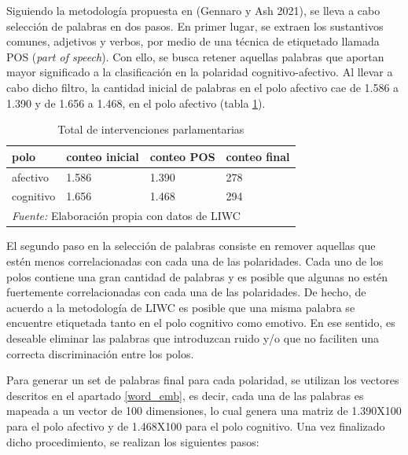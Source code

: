 \documentclass[
  12pt,
]{article}
\begin{document}
Siguiendo la metodología propuesta en (Gennaro y Ash 2021), se lleva a
cabo selección de palabras en dos pasos. En primer lugar, se extraen los
sustantivos comunes, adjetivos y verbos, por medio de una técnica de
etiquetado llamada POS (\emph{part of speech}). Con ello, se busca
retener aquellas palabras que aportan mayor significado a la
clasificación en la polaridad cognitivo-afectivo. Al llevar a cabo dicho
filtro, la cantidad inicial de palabras en el polo afectivo cae de 1.586
a 1.390 y de 1.656 a 1.468, en el polo afectivo (tabla
\ref{tab:tabla_filtro_polos}).

\begin{table}[H]

\caption{\label{tab:tabla_filtro_polos}Total de intervenciones parlamentarias}
\centering
\begin{tabular}[t]{llll}
\toprule
polo & conteo inicial & conteo POS & conteo final\\
\midrule
afectivo & 1.586 & 1.390 & 278\\
cognitivo & 1.656 & 1.468 & 294\\
\bottomrule
\multicolumn{4}{l}{\rule{0pt}{1em}\textit{Fuente:} Elaboración propia con datos de LIWC}\\
\end{tabular}
\end{table}

El segundo paso en la selección de palabras consiste en remover aquellas
que estén menos correlacionadas con cada una de las polaridades. Cada
uno de los polos contiene una gran cantidad de palabras y es posible que
algunas no estén fuertemente correlacionadas con cada una de las
polaridades. De hecho, de acuerdo a la metodología de LIWC es posible
que una misma palabra se encuentre etiquetada tanto en el polo cognitivo
como emotivo. En ese sentido, es deseable eliminar las palabras que
introduzcan ruido y/o que no faciliten una correcta discriminación entre
los polos.

Para generar un set de palabras final para cada polaridad, se utilizan
los vectores descritos en el apartado \ref{word_emb}, es decir, cada una
de las palabras es mapeada a un vector de 100 dimensiones, lo cual
genera una matriz de 1.390X100 para el polo afectivo y de 1.468X100 para
el polo cognitivo. Una vez finalizado dicho procedimiento, se realizan
los siguientes pasos:
\end{document}
